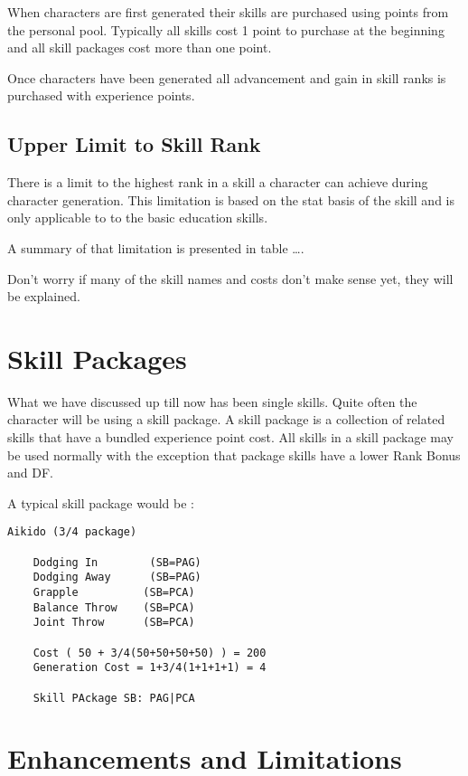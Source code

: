 When characters are first generated their skills are purchased
using points from the personal pool. Typically all skills cost 1 point 
to purchase at the beginning and all skill packages cost more than
one point.

Once characters have been generated all advancement and gain in skill
ranks is purchased with experience points.

\subsection{Upper Limit to Skill Rank}

There is a limit to the highest rank in a skill a character can
achieve during character generation. This limitation
is based on the stat basis of the skill and is only applicable to to
the basic education skills.

A summary of that limitation is presented in table \dots.



Don't worry if many of the skill names and costs don't make sense
yet, they will be explained.

\section{Skill Packages}

What we have discussed up till now has been single skills.
Quite often the character will be using a skill package.
A skill package is a collection of related
skills that have a bundled experience point cost.
All skills in a skill package may be used normally with the
exception that package skills have a lower Rank Bonus and DF.

A typical skill package would be :

\begin{verbatim}
Aikido (3/4 package)

	Dodging In		  (SB=PAG)
	Dodging Away	  (SB=PAG)
	Grapple			 (SB=PCA)
	Balance Throw	 (SB=PCA)
	Joint Throw		 (SB=PCA)

	Cost ( 50 + 3/4(50+50+50+50) ) = 200
	Generation Cost = 1+3/4(1+1+1+1) = 4

	Skill PAckage SB: PAG|PCA

\end{verbatim}

\section{Enhancements and Limitations}

